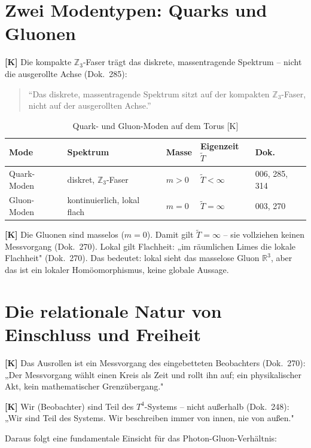 \section{Zwei Modentypen: Quarks und Gluonen}

\textbf{[K]} Die kompakte $\mathbb{Z}_3$-Faser trägt das diskrete,
massentragende Spektrum -- nicht die ausgerollte Achse (Dok.~285):
\begin{quote}
``Das diskrete, massentragende Spektrum sitzt auf der kompakten
$\mathbb{Z}_3$-Faser, nicht auf der ausgerollten Achse.''
\end{quote}

\begin{table}[h]
\centering
\caption{Quark- und Gluon-Moden auf dem Torus [K]}
\label{tab:moden}
\begin{tabular}{lllll}
\toprule
Mode & Spektrum & Masse & Eigenzeit $\tilde{T}$ & Dok. \\
\midrule
Quark-Moden & diskret, $\mathbb{Z}_3$-Faser
  & $m > 0$ & $\tilde{T} < \infty$ & 006, 285, 314 \\
Gluon-Moden & kontinuierlich, lokal flach
  & $m = 0$ & $\tilde{T} = \infty$ & 003, 270 \\
\bottomrule
\end{tabular}
\end{table}

\textbf{[K]} Die Gluonen sind masselos ($m = 0$). Damit gilt
$\tilde{T} = \infty$ -- sie vollziehen keinen Messvorgang (Dok.~270).
Lokal gilt Flachheit: „im räumlichen Limes die lokale Flachheit"
(Dok.~270). Das bedeutet: lokal sieht das masselose Gluon $\mathbb{R}^3$,
aber das ist ein lokaler Homöomorphismus, keine globale Aussage.

\section{Die relationale Natur von Einschluss und Freiheit}

\textbf{[K]} Das Ausrollen ist ein Messvorgang des eingebetteten
Beobachters (Dok.~270): „Der Messvorgang wählt einen Kreis als Zeit
und rollt ihn auf; ein physikalischer Akt, kein mathematischer
Grenzübergang."

\textbf{[K]} Wir (Beobachter) sind Teil des $T^4$-Systems -- nicht
außerhalb (Dok.~248): „Wir sind Teil des Systems. Wir beschreiben
immer von innen, nie von außen."

Daraus folgt eine fundamentale Einsicht für das Photon-Gluon-Verhältnis:

